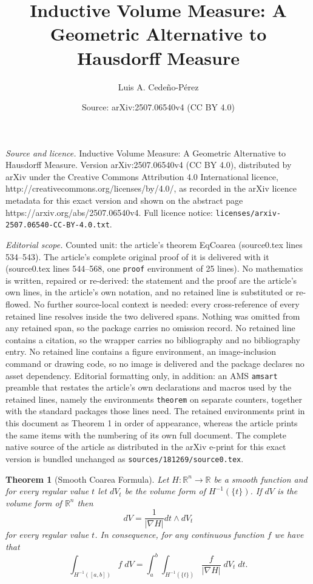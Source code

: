 \documentclass[10pt,a4paper]{amsart}
\title{Inductive Volume Measure: A Geometric Alternative to Hausdorff Measure}
\author{Luis A. Cede\~no-P\'erez}
\date{Source: arXiv:2507.06540v4 (CC BY 4.0)}
\newtheorem{theorem}{Theorem}
\begin{document}
\maketitle

\noindent\emph{Source and licence.} Inductive Volume Measure: A Geometric Alternative to Hausdorff Measure. Version arXiv:2507.06540v4 (CC BY 4.0), distributed by arXiv under the Creative Commons Attribution 4.0 International licence, http://creativecommons.org/licenses/by/4.0/, as recorded in the arXiv licence metadata for this exact version and shown on the abstract page https://arxiv.org/abs/2507.06540v4. Full licence notice: \texttt{licenses/arxiv-2507.06540-CC-BY-4.0.txt}.\par\smallskip

\noindent\textit{Editorial scope.} Counted unit: the article's theorem EqCoarea (source0.tex lines 534--543). The article's complete original proof of it is delivered with it (source0.tex lines 544--568, one \texttt{proof} environment of 25 lines). No mathematics is written, repaired or re-derived: the statement and the proof are the article's own lines, in the article's own notation, and no retained line is substituted or re-flowed.  No further source-local context is needed: every cross-reference of every retained line resolves inside the two delivered spans.  Nothing was omitted from any retained span, so the package carries no omission record.  No retained line contains a citation, so the wrapper carries no bibliography and no bibliography entry.  No retained line contains a figure environment, an image-inclusion command or drawing code, so no image is delivered and the package declares no asset dependency.  Editorial formatting only, in addition: an AMS \texttt{amsart} preamble that restates the article's own declarations and macros used by the retained lines, namely the environments \texttt{theorem} on separate counters, together with the standard packages those lines need.  The retained environments print in this document as Theorem 1 in order of appearance, whereas the article prints the same items with the numbering of its own full document.  The complete native source of the article as distributed in the arXiv e-print for this exact version is bundled unchanged as \texttt{sources/181269/source0.tex}.
\begin{theorem}[Smooth Coarea Formula]
Let $H\colon \mathbb{R}^{n} \to \mathbb{R}$ be a smooth function and for every regular value $t$ let $dV_{t}$ be the volume form of $H^{-1}(\{t\})$. If $dV$ is the volume form of $\mathbb{R}^{n}$ then
\begin{equation*}
    dV = \frac{1}{|\nabla H|} dt\wedge dV_{t}
\end{equation*}
for every regular value $t$. In consequence, for any continuous function $f$ we have that
\begin{equation}\label{EqCoarea}
    \int_{H^{-1}([a,b])} f\;dV = \int_{a}^{b}\int_{H^{-1}(\{t\})} \frac{f}{|\nabla H|}\;dV_{t}\;dt.
\end{equation}
\end{theorem}
\end{document}
